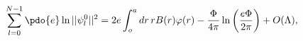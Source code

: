 \begin{equation}
\label{Eq_A45}
\sum^{N-1}_{l=0} \pdo{e} \ln ||\psi^0_l||^2
  = 2e \int^a_o dr \, r B(r) \varphi(r)
    - \frac{\Phi}{4 \pi} \ln \left(\frac{e\Phi}{2\pi}\right) + O(\Lambda),
\end{equation}

